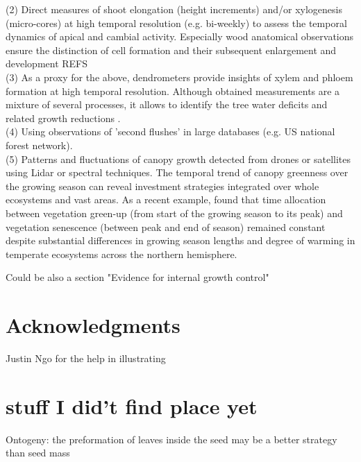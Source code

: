 \documentclass{article}
\begin{document}
	(2) Direct measures of shoot elongation (height increments) and/or xylogenesis (micro-cores) at high temporal resolution (e.g. bi-weekly) to assess the temporal dynamics of apical and cambial activity. Especially wood anatomical observations ensure the distinction of cell formation and their subsequent enlargement and development REFS\\
	
	(3) As a proxy for the above, dendrometers provide insights of xylem and phloem formation at high temporal resolution. Although obtained measurements are a mixture of several processes, it allows to identify the tree water deficits and related growth reductions \cite{etzoldNumberGrowthDays2021, zweifelWhyTreesGrow2021}. \\
	
	(4) Using observations of 'second flushes' in large databases (e.g. US national forest network). \\
	
	(5) Patterns and fluctuations of canopy growth detected from drones or satellites using Lidar or spectral techniques. The temporal trend of canopy greenness over the growing season can reveal investment strategies integrated over whole ecosystems and vast areas. As a recent example, \citet{mengConsistentTimeAllocation2024}  found that time allocation between vegetation green-up (from start of the growing season to its peak) and vegetation senescence (between peak and end of season) remained constant despite substantial differences in growing season lengths and degree of warming in temperate ecosystems across the northern hemisphere. 
	
	Could be also a section "Evidence for internal growth control" 

	

	
\section*{Acknowledgments}
	Justin Ngo for the help in illustrating
	

	
	

	
	\pagebreak
	

	\newpage
\section*{stuff I did't find place yet}
Ontogeny: 
the preformation of leaves inside the seed may be a better strategy than seed mass \citep{silvaCouldPresencePreformed2023}
\end{document}
